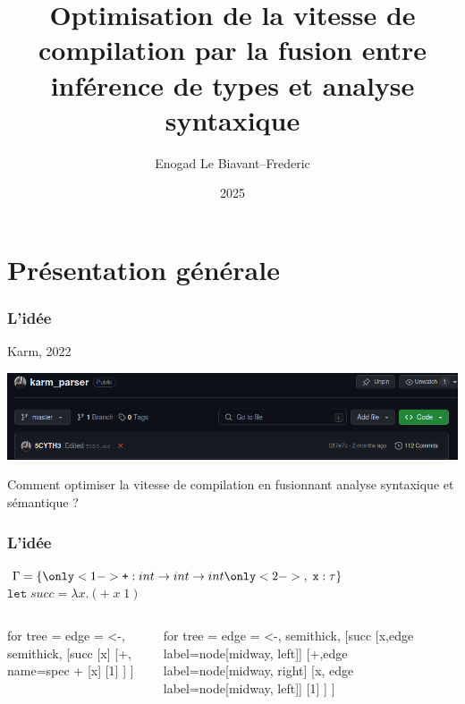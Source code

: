 \documentclass{beamer}
\title{Optimisation de la vitesse de compilation par la fusion entre inférence de types et analyse syntaxique}
\author{Enogad Le Biavant--Frederic}
\institute{Alain René Lesage MPI}
\date{2025}
\begin{document}
\frame{\titlepage}

\section{Présentation générale}
\begin{frame}
		\frametitle{L'idée}
		Karm, 2022
		\begin{center}
				\includegraphics[scale=0.25]{repo}
		\end{center}
		Comment optimiser la vitesse de compilation en fusionnant analyse syntaxique et sémantique ?
		
\end{frame}

\begin{frame}[fragile]
		\frametitle{L'idée}

		$\Gamma = \{ 
				\only<1->{\texttt +: int \rightarrow int \rightarrow int}
				\only<2->{,\; \texttt x: \tau}
		\}$
		\\
		$\texttt{let} \; succ = \lambda x.(+ \; x \; 1)$
		
		\begin{columns}
				\begin{column}{0.5\textwidth}
						\begin{center}
						\begin{forest}
								for tree = {
										edge = {<-, semithick},
								}
								[succ
										[x]
										[+, name=spec +
												[x]
												[1]	
										]
								]
						\end{forest}
						\end{center}
				\end{column}
				\begin{column}{0.5\textwidth}
						\begin{center}
						\begin{forest}
								for tree = {
										edge = {<-, semithick},
								}
								[succ
								[x,edge label={node[midway, left]{\only<1->{$\{x:\tau\}$}}}]
										[+,edge label={node[midway, right]{\only<3->{$\{\tau = int\}$}}}
												[x, edge label={node[midway, left]{\only<2->{$\{x:\tau\}$}}}]
												[1]	
										]
								]
						\end{forest}
						\end{center}
				\end{column}
		\end{columns}
\end{frame}
\end{document}
